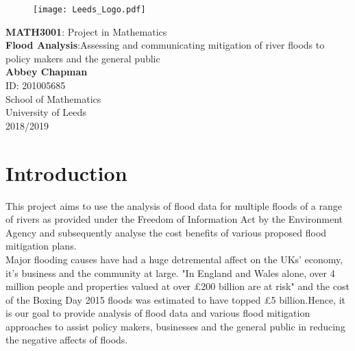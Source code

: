 \documentclass[11 pt, a4paper]{article}
\begin{document}
\begin{titlepage}
\begin{center}

\begin{figure}[H]
\centering
\texttt{[image: Leeds\_Logo.pdf]}
\end{figure}

\vspace{4cm}
{\LARGE \textbf{MATH3001}: Project in Mathematics}\\

\vspace{1cm}
{\Huge \textbf{Flood Analysis}:Assessing and communicating mitigation of river floods to policy makers and the general public}\\
\vspace{5cm}
\textbf{Abbey Chapman}\\
ID: 201005685\\
\vfill
School of Mathematics\\
University of Leeds\\
2018/2019
\end{center}
\end{titlepage}

\tableofcontents 
\noindent \hrulefill

\newpage
\section{Introduction}
This project aims to use the analysis of flood data for multiple floods of a range of rivers as provided under the Freedom of Information Act by the Environment Agency and subsequently analyse the cost benefits of various proposed flood mitigation plans. \\
Major flooding causes have had a huge detremental affect on the UKs' economy, it's business and the community at large. "In England and Wales alone, over 4 million people and properties valued at over £200 billion are at risk"\cite{1} and the cost of the Boxing Day 2015 floods was estimated to have topped \pounds5 billion\cite{2}.Hence, it is our goal to provide analysis of flood data and various flood mitigation approaches to assist policy makers, businesses and the general public in reducing the negative affects of floods.\\
\end{document}
